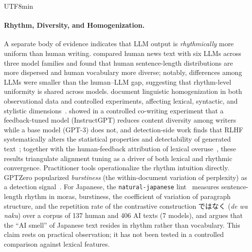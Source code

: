 \documentclass[11pt,a4paper]{article}
\begin{document}
\begin{CJK}{UTF8}{min}
\paragraph{Rhythm, Diversity, and Homogenization.}
A separate body of evidence indicates that LLM output is \emph{rhythmically} more uniform than human writing. \citet{munozortiz2024contrasting} compared human news text with six LLMs across three model families and found that human sentence-length distributions are more dispersed and human vocabulary more diverse; notably, differences among LLMs were smaller than the human--LLM gap, suggesting that rhythm-level uniformity is shared across models. \citet{sourati2025shrinking} document linguistic homogenization in both observational data and controlled experiments, affecting lexical, syntactic, and stylistic dimensions~\citep[see also the review by][]{homogenizing2026review}. \citet{padmakumar2024diversity} showed in a controlled co-writing experiment that a feedback-tuned model (InstructGPT) reduces content diversity among writers while a base model (GPT-3) does not, and detection-side work finds that RLHF systematically alters the statistical properties and detectability of generated text~\citep{rlhf2025detectability}; together with the human-feedback attribution of lexical overuse~\citep{juzek2025overuse}, these results triangulate alignment tuning as a driver of both lexical and rhythmic convergence. Practitioner tools operationalize the rhythm intuition directly. GPTZero popularized \emph{burstiness} (the within-document variation of perplexity) as a detection signal~\citep{gptzero2023burstiness}. For Japanese, the \texttt{natural-japanese} lint~\citep{mizoguchi2026natural} measures sentence-length rhythm in moras, burstiness, the coefficient of variation of paragraph structure, and the repetition rate of the contrastive construction ではなく (\textit{de wa naku}) over a corpus of 137 human and 406 AI texts (7 models), and argues that the ``AI smell'' of Japanese text resides in rhythm rather than vocabulary. This claim rests on practical observation; it has not been tested in a controlled comparison against lexical features.


\end{CJK}
\end{document}
